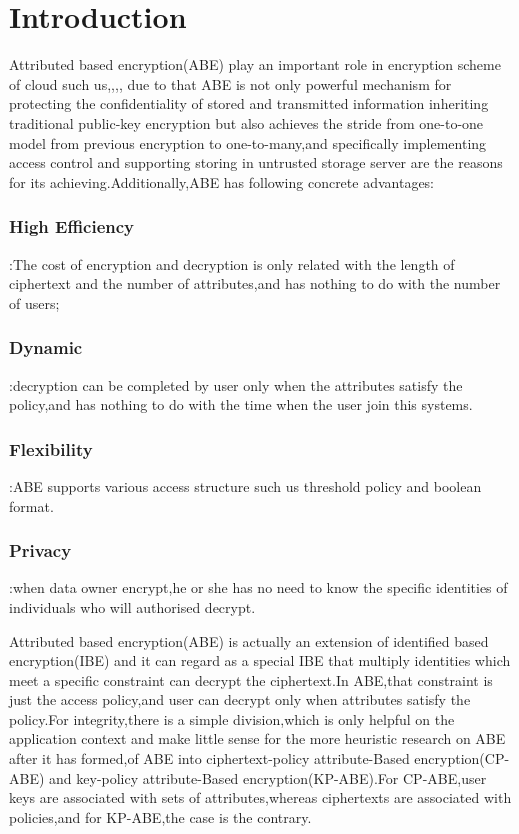 \section{Introduction}
Attributed based encryption(ABE) play an important role in encryption scheme of cloud such us\cite{Li Ming:tpds},\cite{other:12},\cite{kp:11},\cite{policy:16},\cite{other:20} due to that ABE is not only powerful mechanism for protecting the confidentiality of stored and transmitted information inheriting traditional public-key encryption but also achieves the stride from one-to-one model from previous encryption to one-to-many\cite{cp:expressive},and specifically implementing access control and supporting storing in untrusted storage server are the reasons for its achieving.Additionally,ABE has following concrete advantages:\subsubsection{High Efficiency}:The cost of encryption and decryption is only related with the length of ciphertext and the number of attributes,and has nothing to do with the number of users;\subsubsection{Dynamic}:decryption can be completed by user only when the attributes satisfy the policy,and has nothing to do with the time when the user join this systems.\subsubsection{Flexibility}:ABE supports various access structure such us threshold policy and boolean format.\subsubsection{Privacy}:when data owner encrypt,he or she has no need to know the specific identities of individuals who will authorised decrypt\cite{Feng:survey}.

Attributed based encryption(ABE) is actually an extension of identified based encryption(IBE) and it can regard as a special IBE that multiply identities which meet a specific constraint can decrypt the ciphertext.In ABE,that constraint is just the access policy,and user can decrypt only when attributes satisfy the policy.For integrity,there is a simple division,which is only helpful on the application context and make little sense for the more heuristic research on ABE after it has formed,of ABE into ciphertext-policy attribute-Based encryption(CP-ABE) and key-policy attribute-Based encryption(KP-ABE).For CP-ABE,user keys are associated with sets of attributes,whereas ciphertexts are associated with policies,and for KP-ABE,the case is the contrary.

